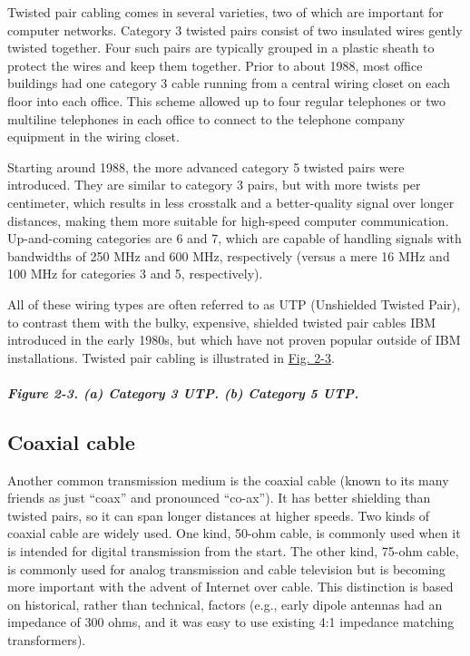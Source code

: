 Twisted pair cabling comes in several varieties, two of which are
important for computer networks. {Category 3} twisted pairs consist of
two insulated wires gently twisted together. Four such pairs are
typically grouped in a plastic sheath to protect the wires and keep them
together. Prior to about 1988, most office buildings had one category 3
cable running from a central {wiring closet} on each floor into each
office. This scheme allowed up to four regular telephones or two
multiline telephones in each office to connect to the telephone company
equipment in the wiring closet.

Starting around 1988, the more advanced {category 5} twisted pairs were
introduced. They are similar to category 3 pairs, but with more twists
per centimeter, which results in less crosstalk and a better-quality
signal over longer distances, making them more suitable for high-speed
computer communication. Up-and-coming categories are 6 and 7, which are
capable of handling signals with bandwidths of 250 MHz and 600 MHz,
respectively (versus a mere 16 MHz and 100 MHz for categories 3 and 5,
respectively).

All of these wiring types are often referred to as {UTP} ({Unshielded
Twisted Pair}), to contrast them with the bulky, expensive, shielded
twisted pair cables IBM introduced in the early 1980s, but which have
not proven popular outside of IBM installations. Twisted pair cabling is
illustrated in
\protect\hyperlink{0130661023_ch02lev1sec2.htmlux5cux23ch02fig03}{Fig.
2-3}.

\subparagraph[Figure 2-3. (a) Category 3 UTP. (b) Category 5
UTP.]{\texorpdfstring{\protect\hypertarget{0130661023_ch02lev1sec2.htmlux5cux23ch02fig03}{}{}Figure
2-3. (a) Category 3 UTP. (b) Category 5
UTP.}{Figure 2-3. (a) Category 3 UTP. (b) Category 5 UTP.}}


\protect\hypertarget{0130661023_ch02lev1sec2.htmlux5cux23ch02lev2sec6}{}{}

\subsection{Coaxial cable}

Another common transmission medium is the {coaxial cable} (known to its
many friends as just ``coax'' and pronounced ``co-ax''). It has better
shielding than twisted pairs, so it can span longer distances at higher
speeds. Two kinds of coaxial cable are widely used. One kind, 50-ohm
cable, is commonly used when it is intended for digital transmission
from the start. The other kind, 75-ohm cable, is commonly used for
analog transmission and cable television but is becoming more important
with the advent of Internet over cable. This distinction is based on
historical, rather than technical, factors (e.g., early dipole antennas
had an impedance of 300 ohms, and it was easy to use existing 4:1
impedance matching transformers).

